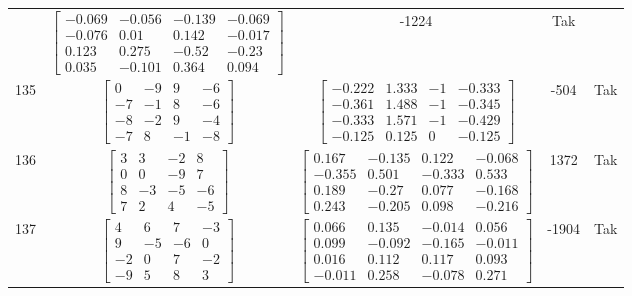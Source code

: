 \documentclass[a4paper,12pt]{article}
\begin{document}
\begin{tabular}{c c c c c}
&
$\begin{bmatrix} -0.069 & -0.056 & -0.139 & -0.069 \\ -0.076 & 0.01 & 0.142 & -0.017 \\ 0.123 & 0.275 & -0.52 & -0.23 \\ 0.035 & -0.101 & 0.364 & 0.094 \end{bmatrix}$
&
-1224
&
Tak
\\
135
&
$\begin{bmatrix} 0 & -9 & 9 & -6 \\ -7 & -1 & 8 & -6 \\ -8 & -2 & 9 & -4 \\ -7 & 8 & -1 & -8 \end{bmatrix}$
&
$\begin{bmatrix} -0.222 & 1.333 & -1 & -0.333 \\ -0.361 & 1.488 & -1 & -0.345 \\ -0.333 & 1.571 & -1 & -0.429 \\ -0.125 & 0.125 & 0 & -0.125 \end{bmatrix}$
&
-504
&
Tak
\\
136
&
$\begin{bmatrix} 3 & 3 & -2 & 8 \\ 0 & 0 & -9 & 7 \\ 8 & -3 & -5 & -6 \\ 7 & 2 & 4 & -5 \end{bmatrix}$
&
$\begin{bmatrix} 0.167 & -0.135 & 0.122 & -0.068 \\ -0.355 & 0.501 & -0.333 & 0.533 \\ 0.189 & -0.27 & 0.077 & -0.168 \\ 0.243 & -0.205 & 0.098 & -0.216 \end{bmatrix}$
&
1372
&
Tak
\\
137
&
$\begin{bmatrix} 4 & 6 & 7 & -3 \\ 9 & -5 & -6 & 0 \\ -2 & 0 & 7 & -2 \\ -9 & 5 & 8 & 3 \end{bmatrix}$
&
$\begin{bmatrix} 0.066 & 0.135 & -0.014 & 0.056 \\ 0.099 & -0.092 & -0.165 & -0.011 \\ 0.016 & 0.112 & 0.117 & 0.093 \\ -0.011 & 0.258 & -0.078 & 0.271 \end{bmatrix}$
&
-1904
&
Tak
\\

\end{tabular}
\end{document}
